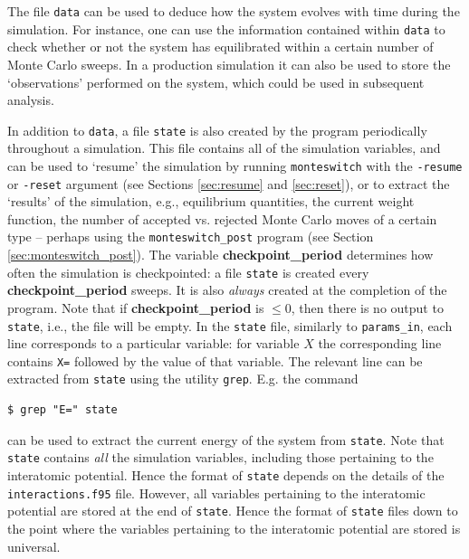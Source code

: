 \documentclass{report}
\begin{document}
The file \texttt{data} can be used to deduce how the system evolves with time during the simulation. For instance, one can use the information contained 
within \texttt{data} to check whether or not the system has equilibrated within a certain number of Monte Carlo sweeps. In a production simulation it
can also be used to store the `observations' performed on the system, which could be used in subsequent analysis.

In addition to \texttt{data}, a file \texttt{state} is also created by the program periodically throughout a simulation. This file contains all of the 
simulation variables, and can be used to `resume' the simulation by running \texttt{monteswitch} with the \texttt{-resume} or \texttt{-reset} argument
(see Sections \ref{sec:resume} and \ref{sec:reset}), or to extract the `results' of the simulation, e.g., equilibrium quantities, the current weight 
function, the number of accepted vs. rejected Monte Carlo moves of a certain type -- perhaps using the \texttt{monteswitch\_post} program 
(see Section \ref{sec:monteswitch_post}).
The variable \textbf{checkpoint\_period} determines how often the simulation is checkpointed: a file \texttt{state} is created every 
\textbf{checkpoint\_period} sweeps. It is also \emph{always} created at the completion of the program. Note that if \textbf{checkpoint\_period} is $\leq 0$, 
then there is no output to \texttt{state}, i.e., the file will be empty.
In the \texttt{state} file, similarly to \texttt{params\_in}, each line corresponds to a particular variable: for variable $X$ the corresponding line contains
\texttt{X=} followed by the value of that variable. The relevant line can be extracted from \texttt{state} using the utility \texttt{grep}. E.g. the command
\begin{verbatim}
$ grep "E=" state
\end{verbatim}
can be used to extract the current energy of the system from \texttt{state}.
Note that \texttt{state} contains \emph{all} the simulation variables, including those
pertaining to the interatomic potential. Hence the format of \texttt{state} depends on the details of the \texttt{interactions.f95} file. However,
all variables pertaining to the interatomic potential are stored at the end of \texttt{state}. Hence the format of \texttt{state} files down to the
point where the variables pertaining to the interatomic potential are stored is universal.
\end{document}
